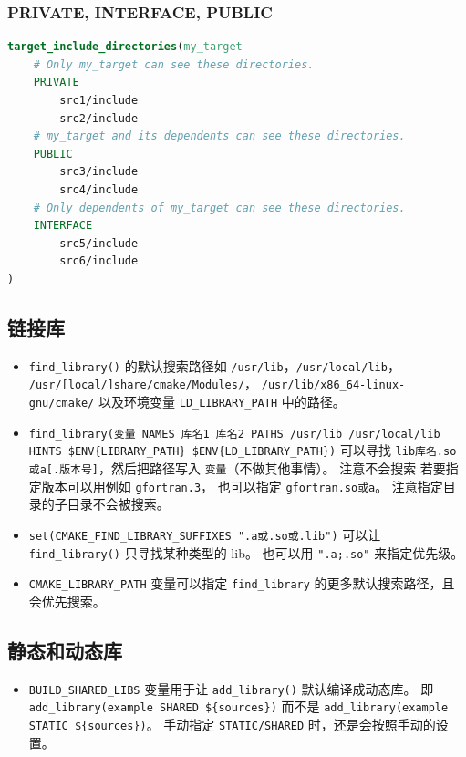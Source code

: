 \subsubsection{PRIVATE, INTERFACE, PUBLIC}
\begin{lstlisting}[language=cmake]
target_include_directories(my_target
    # Only my_target can see these directories.
    PRIVATE
        src1/include
        src2/include
    # my_target and its dependents can see these directories.
    PUBLIC
        src3/include
        src4/include
    # Only dependents of my_target can see these directories.
    INTERFACE
        src5/include
        src6/include
)
\end{lstlisting}

\subsection{链接库}
\begin{itemize}
\item \verb`find_library()` 的默认搜索路径如 \verb`/usr/lib`，\verb`/usr/local/lib`， \verb`/usr/[local/]share/cmake/Modules/`， \verb`/usr/lib/x86_64-linux-gnu/cmake/` 以及环境变量 \verb`LD_LIBRARY_PATH` 中的路径。
\item \verb`find_library(变量 NAMES 库名1 库名2 PATHS /usr/lib /usr/local/lib HINTS $ENV{LIBRARY_PATH} $ENV{LD_LIBRARY_PATH})` 可以寻找 \verb`lib库名.so或a[.版本号]`，然后把路径写入 \verb`变量`（不做其他事情）。 注意不会搜索 若要指定版本可以用例如 \verb`gfortran.3`， 也可以指定 \verb`gfortran.so或a`。 注意指定目录的子目录不会被搜索。
\item \verb`set(CMAKE_FIND_LIBRARY_SUFFIXES ".a或.so或.lib")` 可以让 \verb`find_library()` 只寻找某种类型的 lib。 也可以用 \verb`".a;.so"` 来指定优先级。
\item \verb`CMAKE_LIBRARY_PATH` 变量可以指定 \verb`find_library` 的更多默认搜索路径，且会优先搜索。
\end{itemize}

\subsection{静态和动态库}
\begin{itemize}
\item \verb`BUILD_SHARED_LIBS` 变量用于让 \verb`add_library()` 默认编译成动态库。 即 \verb`add_library(example SHARED ${sources})` 而不是 \verb`add_library(example STATIC ${sources})`。 手动指定 \verb`STATIC/SHARED` 时，还是会按照手动的设置。
\end{itemize}


